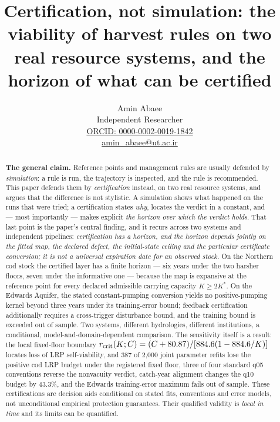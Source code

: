 \documentclass[11pt]{article}
\begin{document}
\title{Certification, not simulation: the viability of harvest rules on two real resource systems, and the horizon of what can be certified}
\author{Amin Abaee\\[0.35em]
{\small Independent Researcher}\\[0.55em]
{\small\href{https://orcid.org/0000-0002-0019-1842}{ORCID: 0000-0002-0019-1842}}\\[0.3em]
{\small\href{mailto:amin\_abaee@ut.ac.ir}{amin\_abaee@ut.ac.ir}}}
\date{}
\maketitle
\begin{abstract}
\noindent\textbf{The general claim.} Reference points and management rules are usually defended by
\emph{simulation}: a rule is run, the trajectory is inspected, and the rule is recommended. This
paper defends them by \emph{certification} instead, on two real resource systems, and argues that
the difference is not stylistic. A simulation shows what happened on the runs that were tried; a
certification states \emph{why}, locates the verdict in a constant, and --- most importantly ---
makes explicit \emph{the horizon over which the verdict holds}. That last point is the paper's
central finding, and it recurs across two systems and independent pipelines: \emph{certification has
a horizon, and the horizon depends jointly on the fitted map, the declared defect, the
initial-state ceiling and the particular certificate conversion; it is not
a universal expiration date for an observed stock.} On the Northern cod stock
the certified layer has a finite horizon --- six years under the two harsher floors, seven under the
informative one --- because the map is expansive at the reference point for every
declared admissible carrying capacity $K\ge2K^*$. On the Edwards Aquifer, the stated constant-pumping conversion yields
no positive-pumping kernel beyond three years under its training-error
bound; feedback certification additionally requires a cross-trigger
disturbance bound, and the training bound is exceeded out of sample. Two systems, different
hydrologies, different institutions, a conditional, model-and-domain-dependent comparison.
The sensitivity itself is a result: the local fixed-floor boundary
$r_{\rm crit}(K;C)=(C+80.87)/[884.6(1-884.6/K)]$ locates loss of LRP
self-viability, and 387 of 2,000 joint parameter refits lose the positive
cod LRP budget under the registered fixed floor, three of
four standard q05 conventions reverse the nonvacuity verdict, catch-year
alignment changes the q10 budget by 43.3\%, and the Edwards training-error
maximum fails out of sample. These certifications are decision aids conditional
on stated fits, conventions and error models, not unconditional empirical
protection guarantees. Their qualified validity is \emph{local in time}
and its limits can be quantified.


\end{abstract}
\end{document}
